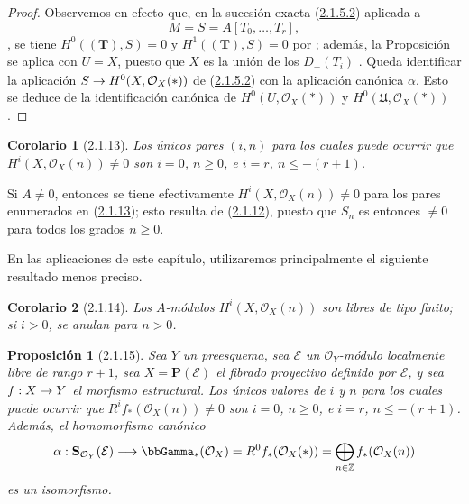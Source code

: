 \documentclass[10pt,oneside,openany]{book}
\theoremstyle{egaenv}\newtheorem*{env}{---}
\theoremstyle{egastatement}
\newtheorem*{proposition}{Proposición}
\newtheorem*{corollary}{Corolario}
\theoremstyle{egadescription}
\renewcommand{\leq}{\leqslant}
\renewcommand{\geq}{\geqslant}
\renewcommand{\to}{\mathchoice{\longrightarrow}{\rightarrow}{\rightarrow}{\rightarrow}}
\begin{document}
\begin{proof}
Observemos en efecto que, en la sucesión exacta
(\hyperref[III.2.1.5.2-fr]{2.1.5.2}) aplicada a
\[
M=S=A[T_0,\ldots,T_r],
\],
se tiene
$H^0((\mathbf T),S)=0$ y $H^1((\mathbf T),S)=0$ por ; además, la Proposición~ se aplica con $U=X$, puesto que $X$ es la unión de los $D_+(T_i)$ .
Queda identificar la aplicación $S\to H^0(X,\mathcal O_X(*))$ de (\hyperref[III.2.1.5.2]{2.1.5.2}) con la aplicación canónica $\alpha$.
Esto se deduce de la identificación canónica de $H^0(U,\mathcal O_X(*))$ y $H^0(\mathfrak U,\mathcal O_X(*))$.
\end{proof}

\begin{corollary}[2.1.13]
\label{III.2.1.13}
\label{III.2.1.13-fr}
Los únicos pares $(i,n)$ para los cuales puede ocurrir que $H^i(X,\mathcal O_X(n))\neq0$ son $i=0$, $n\geq0$, e $i=r$, $n\leq-(r+1)$.
\end{corollary}

Si $A\neq0$, entonces se tiene efectivamente $H^i(X,\mathcal O_X(n))\neq0$ para los pares enumerados en
(\hyperref[III.2.1.13-fr]{2.1.13}); esto resulta de
(\hyperref[III.2.1.12-fr]{2.1.12}), puesto que $S_n$ es entonces $\neq0$ para
todos los grados $n\geq0$.

En las aplicaciones de este capítulo, utilizaremos principalmente el siguiente resultado menos preciso.

\begin{corollary}[2.1.14]
\label{III.2.1.14}
\label{III.2.1.14-fr}
Los $A$-módulos $H^i(X,\mathcal O_X(n))$ son libres de tipo finito; si $i>0$, se anulan para $n>0$.
\end{corollary}

\begin{proposition}[2.1.15]
\label{III.2.1.15}
\label{III.2.1.15-fr}
Sea $Y$ un preesquema, sea $\mathcal E$ un $\mathcal O_Y$-módulo localmente libre de rango $r+1$, sea $X=\mathbf P(\mathcal E)$ el fibrado proyectivo definido por $\mathcal E$, y sea $f:X\to Y$ el morfismo estructural.
Los únicos valores de $i$ y $n$ para los cuales puede ocurrir que $R^if_*(\mathcal O_X(n))\neq0$ son $i=0$, $n\geq0$, e $i=r$, $n\leq-(r+1)$.
Además, el homomorfismo canónico 
\[
\alpha:\mathbf S_{\mathcal O_Y}(\mathcal E)
\longrightarrow\bbGamma_*(\mathcal O_X)
=R^0f_*(\mathcal O_X(*))
=\bigoplus_{n\in\mathbb Z}f_*(\mathcal O_X(n))
\]
es un isomorfismo.
\end{proposition}
\end{document}
